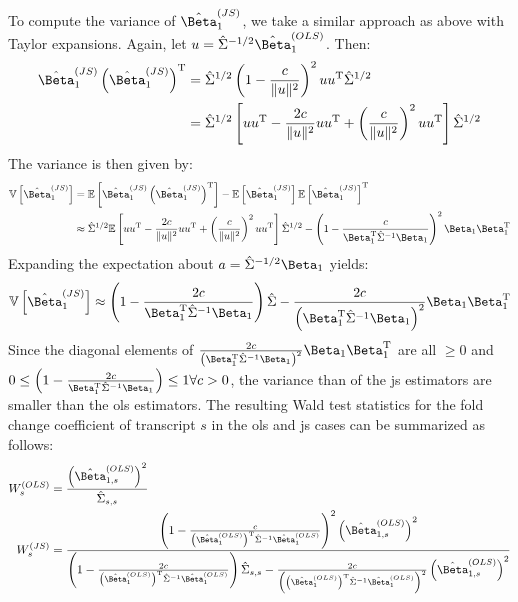 To compute the variance of $\hat{\Beta}_1^{(JS)}$, we take a similar approach as above with Taylor expansions.
Again, let $u = \hat{\Sigma}^{-1/2} \hat{\Beta}_1^{(OLS)}$.
Then:
%
\begin{align}
  \hat{\Beta}_1^{(JS)} \left( \hat{\Beta}_1^{(JS)} \right)^\tran & = \hat{\Sigma}^{1/2} \left( 1 - \frac{c}{\Vert u \Vert ^2} \right)^2 u u^\tran \hat{\Sigma}^{1/2}                                                                \\
                                                                 & = \hat{\Sigma}^{1/2} \left[ u u^\tran - \frac{2c}{\Vert u \Vert ^2} u u^\tran + \left( \frac{c}{\Vert u \Vert ^2} \right)^2 u u^\tran \right] \hat{\Sigma}^{1/2}
\end{align}
%
The variance is then given by:
%
\begin{align}
  \variance{ \hat{\Beta}_1^{(JS)} } & = \expect{ \hat{\Beta}_1^{(JS)} \left( \hat{\Beta}_1^{(JS)} \right)^\tran } - \expect{ \hat{\Beta}_1^{(JS)} } \expect{ \hat{\Beta}_1^{(JS)} }^\tran                \\
                                    & \approx \hat{\Sigma}^{1/2} \expect{ u u^\tran - \frac{2c}{\Vert u \Vert ^2} u u^\tran + \left( \frac{c}{\Vert u \Vert ^2} \right)^2 u u^\tran } \hat{\Sigma}^{1/2}
  - \left(1 - \frac{c}{\Beta_1^\tran \hat{\Sigma}^{-1} \Beta_1} \right)^2 \Beta_1 \Beta_1^\tran
\end{align}
%
Expanding the expectation about $a = \hat{\Sigma}^{-1/2} \Beta_1$ yields:
%
\begin{equation}
  \variance{ \hat{\Beta}_1^{(JS)} }
  \approx \left(1 - \frac{2c}{\Beta_1^\tran \hat{\Sigma}^{-1} \Beta_1} \right) \hat{\Sigma}
  - \frac{2c}{\left( \Beta_1^\tran \hat{\Sigma}^{-1} \Beta_1 \right)^2} \Beta_1 \Beta_1^\tran
\end{equation}
%
Since the diagonal elements of $\frac{2c}{\left( \Beta_1^\tran \hat{\Sigma}^{-1} \Beta_1 \right)^2} \Beta_1 \Beta_1^\tran$ are all $\ge 0$ and $0 \le \left(1 - \frac{2c}{\Beta_1^\tran \hat{\Sigma}^{-1} \Beta_1} \right) \le 1 \forall c > 0$, the variance than of the \gls{js} estimators are smaller than the \gls{ols} estimators.
The resulting Wald test statistics for the fold change coefficient of transcript $s$ in the \gls{ols} and \gls{js} cases can be summarized as follows:
%
\begin{align}
  W_s^{(OLS)} & = \frac{ \left( \hat{\Beta}_{1, s}^{(OLS)} \right)^2 }{ \hat{\Sigma}_{s,s} } \\
  W_s^{(JS)}  & = \frac{
  \left( 1 - \frac{ c }{ \left( \hat{\Beta}_1^{(OLS)} \right)^\tran \hat{\Sigma}^{-1} \hat{\Beta}_1^{(OLS)} } \right)^2 \left( \hat{\Beta}_{1, s}^{(OLS)} \right)^2
  }{
  \left(1 - \frac{2c}{ \left( \hat{\Beta}_1^{(OLS)} \right)^\tran \hat{\Sigma}^{-1} \hat{\Beta}_1^{(OLS)}} \right) \hat{\Sigma}_{s,s}
  - \frac{2c}{\left( \left( \hat{\Beta}_1^{(OLS)} \right)^\tran \hat{\Sigma}^{-1} \hat{\Beta}_1^{(OLS)} \right)^2} \left( \hat{\Beta}_{1, s}^{(OLS)} \right)^2
  }
\end{align}
